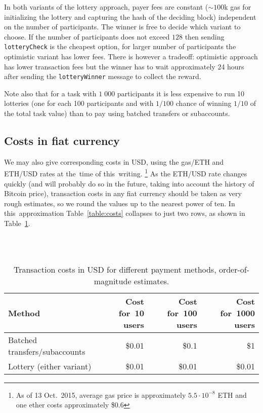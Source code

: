 \documentclass[a4paper]{article}
\newcommand{\ETH}{ETH}%
\begin{document}
    In both variants of the lottery approach, payer fees are constant
    ($\sim 100$k gas for initializing the lottery and capturing the
    hash of the deciding block) independent on the number of
    participants. The winner is free to decide which variant to choose.
    If the number of participants does not exceed $128$ then sending \verb!lotteryCheck!
    is the cheapest option, for larger number of participants the optimistic
    variant has lower fees. There is however a tradeoff: optimistic approach has
    lower transaction fees but the winner has to wait approximately 24 hours after
    sending the \verb!lotteryWinner! message to collect the reward. 

    Note also that for a task with $1\;000$ participants it is less
    expensive to run 10 lotteries (one for each 100 participants and
    with $1 / 100$ chance of winning $1 / 10$ of the total task value)
    than to pay using batched transfers or subaccounts.
    
    \subsection{Costs in fiat currency}
    We may also give corresponding costs in USD, using the
    gas/\ETH{} and \ETH{}/USD rates at the~time of this~writing.%
    \footnote{As of 13 Oct.\ 2015, average
      gas price is approximately $5.5 \cdot 10^{-8}$ \ETH{} and one
      ether costs approximately \$0.6}%
    As the \ETH{}/USD rate changes quickly (and will probably do so in
    the future, taking into account the history of Bitcoin price),
    transaction costs in any fiat currency should be taken as very
    rough estimates, so we round the values up to the nearest power of ten.
    In this~approximation Table~\ref{table:costs} collapses to just two rows,
    as shown in Table~\ref{table:costs-usd}.
       
    \begin{table}
      \centering ~\\~\\  %
      \begin{tabular}{lrrr} 
        \hline
        Method              & Cost for~10 users & Cost for~100 users & Cost for~1000 users \\ \hline
        Batched transfers/subaccounts  & ~ \$0.01          & ~ \$0.1            & ~ \$1    \\ %
        Lottery (either variant)       & ~ \$0.01          & ~ \$0.01           & ~ \$0.01 \\ \hline
      \end{tabular}
      \caption{Transaction costs in USD for different payment methods, order-of-magnitude estimates.}
      \label{table:costs-usd}
    \end{table}
\end{document}

